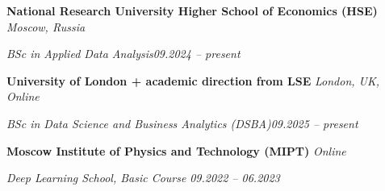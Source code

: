 

\textbf{National Research University Higher School of Economics (HSE)} \hfill \emph{Moscow, Russia}

\textit{BSc in Applied Data Analysis}\hfill \emph{09.2024 -- present}\vspace{0.12cm}

\textbf{University of London + academic direction from LSE} \hfill \emph{London, UK, Online}

\textit{BSc in Data Science and Business Analytics (DSBA)}\hfill \emph{09.2025 -- present}\vspace{0.12cm}
	
\textbf{Moscow Institute of Physics and Technology (MIPT)} \hfill \emph{Online}
	
\textit{Deep Learning School, Basic Course} \hfill \emph{09.2022 -- 06.2023}
